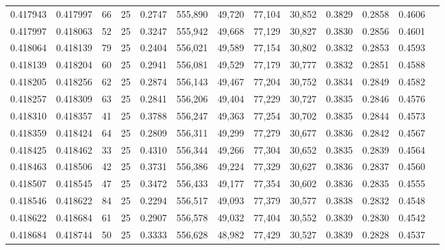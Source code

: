 \begin{tabular}{rrrrrrrrrrrrr}
0.417943 & 0.417997 &    66 &  25 &                                     0.2747 & 555,890 &  49,720 &  77,104 &  30,852 & 0.3829 & 0.2858 & 0.4606 \\
0.417997 & 0.418063 &    52 &  25 &                                     0.3247 & 555,942 &  49,668 &  77,129 &  30,827 & 0.3830 & 0.2856 & 0.4601 \\
0.418064 & 0.418139 &    79 &  25 &                                     0.2404 & 556,021 &  49,589 &  77,154 &  30,802 & 0.3832 & 0.2853 & 0.4593 \\
0.418139 & 0.418204 &    60 &  25 &                                     0.2941 & 556,081 &  49,529 &  77,179 &  30,777 & 0.3832 & 0.2851 & 0.4588 \\
0.418205 & 0.418256 &    62 &  25 &                                     0.2874 & 556,143 &  49,467 &  77,204 &  30,752 & 0.3834 & 0.2849 & 0.4582 \\
0.418257 & 0.418309 &    63 &  25 &                                     0.2841 & 556,206 &  49,404 &  77,229 &  30,727 & 0.3835 & 0.2846 & 0.4576 \\
0.418310 & 0.418357 &    41 &  25 &                                     0.3788 & 556,247 &  49,363 &  77,254 &  30,702 & 0.3835 & 0.2844 & 0.4573 \\
0.418359 & 0.418424 &    64 &  25 &                                     0.2809 & 556,311 &  49,299 &  77,279 &  30,677 & 0.3836 & 0.2842 & 0.4567 \\
0.418425 & 0.418462 &    33 &  25 &                                     0.4310 & 556,344 &  49,266 &  77,304 &  30,652 & 0.3835 & 0.2839 & 0.4564 \\
0.418463 & 0.418506 &    42 &  25 &                                     0.3731 & 556,386 &  49,224 &  77,329 &  30,627 & 0.3836 & 0.2837 & 0.4560 \\
0.418507 & 0.418545 &    47 &  25 &                                     0.3472 & 556,433 &  49,177 &  77,354 &  30,602 & 0.3836 & 0.2835 & 0.4555 \\
0.418546 & 0.418622 &    84 &  25 &                                     0.2294 & 556,517 &  49,093 &  77,379 &  30,577 & 0.3838 & 0.2832 & 0.4548 \\
0.418622 & 0.418684 &    61 &  25 &                                     0.2907 & 556,578 &  49,032 &  77,404 &  30,552 & 0.3839 & 0.2830 & 0.4542 \\
0.418684 & 0.418744 &    50 &  25 &                                     0.3333 & 556,628 &  48,982 &  77,429 &  30,527 & 0.3839 & 0.2828 & 0.4537 \\

\end{tabular}
